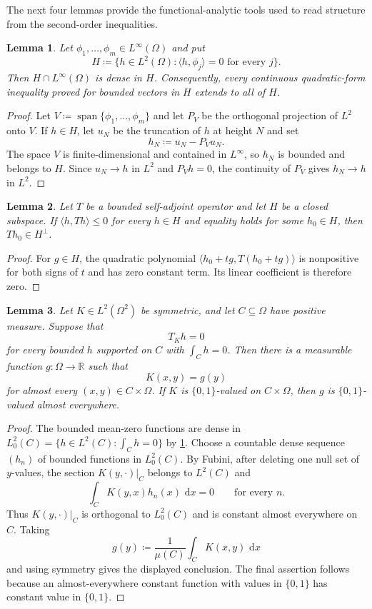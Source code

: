 \documentclass[10pt]{article}
\numberwithin{equation}{section}
\newtheorem{lemma}[lemma]{Lemma}
\newcommand{\R}{\mathbb R}
\newcommand{\dd}{\,\mathrm d}
\begin{document}
The next four lemmas provide the functional-analytic tools used to read structure from the second-order inequalities.

\begin{lemma}\label{lem:bounded-tangent-density}
Let $\phi_1,\ldots,\phi_m\in L^\infty(\Omega)$ and put
\[
 H\coloneqq\{h\in L^2(\Omega)\colon \langle h,\phi_j\rangle=0
       \text{ for every }j\}.
\]
Then $H\cap L^\infty(\Omega)$ is dense in $H$.  Consequently, every continuous quadratic-form inequality proved for bounded vectors in $H$ extends to all of $H$.
\end{lemma}

\begin{proof}
Let $V\coloneqq\operatorname{span}\{\phi_1,\ldots,\phi_m\}$ and let $P_V$ be the orthogonal projection of $L^2$ onto $V$.  If $h\in H$, let $u_N$ be the truncation of $h$ at height $N$ and set
\[
 h_N\coloneqq u_N-P_Vu_N.
\]
The space $V$ is finite-dimensional and contained in $L^\infty$, so $h_N$ is bounded and belongs to $H$.  Since $u_N\to h$ in $L^2$ and $P_Vh=0$, the continuity of $P_V$ gives $h_N\to h$ in $L^2$.
\end{proof}

\begin{lemma}\label{lem:null-polarization}
Let $T$ be a bounded self-adjoint operator and let $H$ be a closed subspace.  If $\langle h,Th\rangle\le0$ for every $h\in H$ and equality holds for some $h_0\in H$, then $Th_0\in H^\perp$.
\end{lemma}

\begin{proof}
For $g\in H$, the quadratic polynomial $\langle h_0+tg,T(h_0+tg)\rangle$ is nonpositive for both signs of $t$ and has zero constant term.  Its linear coefficient is therefore zero.
\end{proof}

\begin{lemma}\label{lem:row-constancy}
Let $K\in L^2(\Omega^2)$ be symmetric, and let $C\subseteq\Omega$ have positive measure.  Suppose that
\[
 T_Kh=0
\]
for every bounded $h$ supported on $C$ with $\int_Ch=0$.  Then there is a measurable function $g:\Omega\to\R$ such that
\[
 K(x,y)=g(y)
\]
for almost every $(x,y)\in C\times\Omega$.  If $K$ is $\{0,1\}$-valued on $C\times\Omega$, then $g$ is $\{0,1\}$-valued almost everywhere.
\end{lemma}

\begin{proof}
The bounded mean-zero functions are dense in $L^2_0(C)=\{h\in L^2(C)\colon \int_Ch=0\}$ by \cref{lem:bounded-tangent-density}.  Choose a countable dense sequence $(h_n)$ of bounded functions in $L^2_0(C)$.  By Fubini, after deleting one null set of $y$-values, the section $K(y,\cdot)|_C$ belongs to $L^2(C)$ and
\[
 \int_CK(y,x)h_n(x)\,\dd x=0
 \qquad\text{for every }n.
\]
Thus $K(y,\cdot)|_C$ is orthogonal to $L^2_0(C)$ and is constant almost everywhere on $C$.  Taking
\[
 g(y)\coloneqq\frac1{\mu(C)}\int_CK(x,y)\,\dd x
\]
and using symmetry gives the displayed conclusion.  The final assertion follows because an almost-everywhere constant function with values in $\{0,1\}$ has constant value in $\{0,1\}$.
\end{proof}
\end{document}
